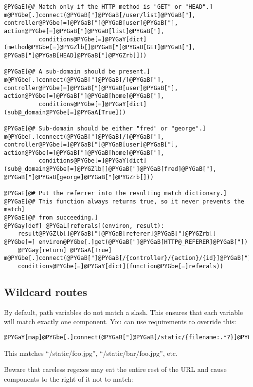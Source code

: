\documentclass[letterpaper,10pt,english]{manual}
\begin{document}
\begin{Verbatim}[commandchars=@\[\]]
@PYGaE[@# Match only if the HTTP method is "GET" or "HEAD".]
m@PYGbe[.]connect(@PYGaB["]@PYGaB[/user/list]@PYGaB["], controller@PYGbe[=]@PYGaB["]@PYGaB[user]@PYGaB["], action@PYGbe[=]@PYGaB["]@PYGaB[list]@PYGaB["],
          conditions@PYGbe[=]@PYGaY[dict](method@PYGbe[=]@PYGZlb[]@PYGaB["]@PYGaB[GET]@PYGaB["], @PYGaB["]@PYGaB[HEAD]@PYGaB["]@PYGZrb[]))

@PYGaE[@# A sub-domain should be present.]
m@PYGbe[.]connect(@PYGaB["]@PYGaB[/]@PYGaB["], controller@PYGbe[=]@PYGaB["]@PYGaB[user]@PYGaB["], action@PYGbe[=]@PYGaB["]@PYGaB[home]@PYGaB["],
          conditions@PYGbe[=]@PYGaY[dict](sub@_domain@PYGbe[=]@PYGaA[True]))

@PYGaE[@# Sub-domain should be either "fred" or "george".]
m@PYGbe[.]connect(@PYGaB["]@PYGaB[/]@PYGaB["], controller@PYGbe[=]@PYGaB["]@PYGaB[user]@PYGaB["], action@PYGbe[=]@PYGaB["]@PYGaB[home]@PYGaB["],
          conditions@PYGbe[=]@PYGaY[dict](sub@_domain@PYGbe[=]@PYGZlb[]@PYGaB["]@PYGaB[fred]@PYGaB["], @PYGaB["]@PYGaB[george]@PYGaB["]@PYGZrb[]))

@PYGaE[@# Put the referrer into the resulting match dictionary.]
@PYGaE[@# This function always returns true, so it never prevents the match]
@PYGaE[@# from succeeding.]
@PYGay[def] @PYGaL[referals](environ, result):
    result@PYGZlb[]@PYGaB["]@PYGaB[referer]@PYGaB["]@PYGZrb[] @PYGbe[=] environ@PYGbe[.]get(@PYGaB["]@PYGaB[HTTP@_REFERER]@PYGaB["])
    @PYGay[return] @PYGaA[True]
m@PYGbe[.]connect(@PYGaB["]@PYGaB[/{controller}/{action}/{id}]@PYGaB["],
    conditions@PYGbe[=]@PYGaY[dict](function@PYGbe[=]referals))
\end{Verbatim}


\subsection{Wildcard routes}

By default, path variables do not match a slash.  This ensures that each
variable will match exactly one component.  You can use requirements to
override this:

\begin{Verbatim}[commandchars=@\[\]]
@PYGaY[map]@PYGbe[.]connect(@PYGaB["]@PYGaB[/static/{filename:.*?}]@PYGaB["])
\end{Verbatim}

This matches ``/static/foo.jpg'', ``/static/bar/foo.jpg'', etc.

Beware that careless regexes may eat the entire rest of the URL and cause
components to the right of it not to match:
\end{document}
